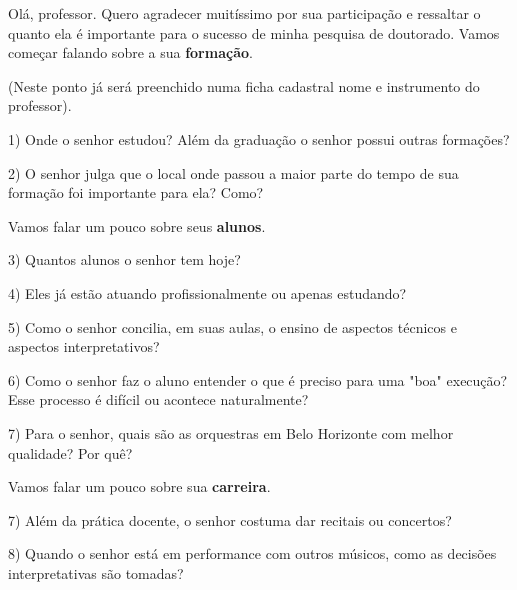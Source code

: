 \documentclass[a4paper, 12pt, openright, oneside, german, french, english, brazil]{abntex2}
\begin{document}
	Olá, professor. Quero agradecer muitíssimo por sua participação e ressaltar o quanto ela é importante para o sucesso de minha pesquisa de doutorado. Vamos começar falando sobre a sua \textbf{formação}.



	\vspace{1cm}



	(Neste ponto já será preenchido numa ficha cadastral nome e instrumento do professor).



	\vspace{1cm}



	1) Onde o senhor estudou? Além da graduação o senhor possui outras formações?



	2) O senhor julga que o local onde passou a maior parte do tempo de sua formação foi importante para ela? Como?



	\vspace{1cm}



	Vamos falar um pouco sobre seus \textbf{alunos}.



	3) Quantos alunos o senhor tem hoje?



	4) Eles já estão atuando profissionalmente ou apenas estudando?



	5) Como o senhor concilia, em suas aulas, o ensino de aspectos técnicos e aspectos interpretativos?



	6) Como o senhor faz o aluno entender o que é preciso para uma "boa" execução? Esse processo é difícil ou acontece naturalmente?


	7) Para o senhor, quais são as orquestras em Belo Horizonte com melhor qualidade? Por quê?



	\vspace{1cm}



	Vamos falar um pouco sobre sua \textbf{carreira}.



	7) Além da prática docente, o senhor costuma dar recitais ou concertos?



	8) Quando o senhor está em performance com outros músicos, como as decisões interpretativas são tomadas?
\end{document}
